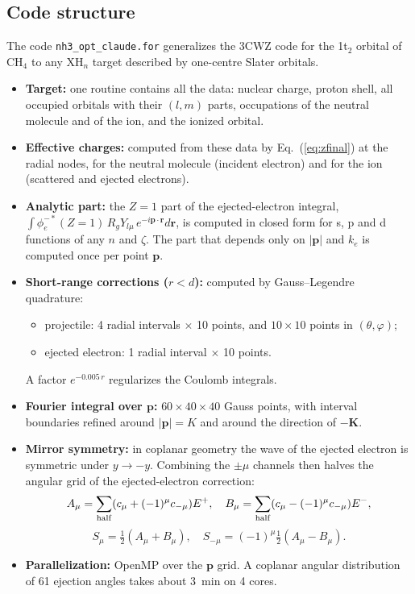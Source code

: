 \documentclass[11pt,a4paper]{article}
\newcommand{\CH}{CH$_4$}
\newcommand{\br}{\mathbf r}
\newcommand{\bp}{\mathbf p}
\begin{document}
\subsection{Code structure}
The code \texttt{nh3\_opt\_claude.for} generalizes the 3CWZ code for the 1t$_2$ orbital of
\CH{} to any XH$_n$ target described by one-centre Slater orbitals.
\begin{itemize}
\item \textbf{Target:} one routine contains all the data: nuclear charge, proton shell, all
  occupied orbitals with their $(l,m)$ parts, occupations of the neutral molecule and of the ion,
  and the ionized orbital.
\item \textbf{Effective charges:} computed from these data by Eq.~(\ref{eq:zfinal}) at the
  radial nodes, for the neutral molecule (incident electron) and for the ion (scattered and
  ejected electrons).
\item \textbf{Analytic part:} the $Z=1$ part of the ejected-electron integral,
  $\int\phi^{-*}_e(Z=1)\,R_g Y_{l\mu}\,e^{-i\bp\cdot\br}d\br$, is computed in closed form for s, p
  and d functions of any $n$ and $\zeta$. The part that depends only on $|\bp|$ and $k_e$ is
  computed once per point $\bp$.
\item \textbf{Short-range corrections ($r<d$):} computed by Gauss--Legendre quadrature:
  \begin{itemize}
  \item projectile: 4 radial intervals $\times$ 10 points, and $10\times10$ points in
    $(\theta,\varphi)$;
  \item ejected electron: 1 radial interval $\times$ 10 points.
  \end{itemize}
  A factor $e^{-0.005\,r}$ regularizes the Coulomb integrals.
\item \textbf{Fourier integral over $\bp$:} $60\times40\times40$ Gauss points, with interval
  boundaries refined around $|\bp|=K$ and around the direction of $-\mathbf K$.
\item \textbf{Mirror symmetry:} in coplanar geometry the wave of the ejected electron is
  symmetric under $y\to-y$. Combining the $\pm\mu$ channels then halves the angular grid of the
  ejected-electron correction:
  \begin{equation}
  A_\mu=\sum_{\rm half}(c_\mu+(-1)^\mu c_{-\mu})E^+,\quad B_\mu=\sum_{\rm half}(c_\mu-(-1)^\mu c_{-\mu})E^-,
  \end{equation}
  \begin{equation}
  S_\mu=\tfrac12(A_\mu+B_\mu),\quad S_{-\mu}=(-1)^\mu\tfrac12(A_\mu-B_\mu).
  \end{equation}
\item \textbf{Parallelization:} OpenMP over the $\bp$ grid. A coplanar angular distribution of 61
  ejection angles takes about 3~min on 4 cores.
\end{itemize}
\end{document}
